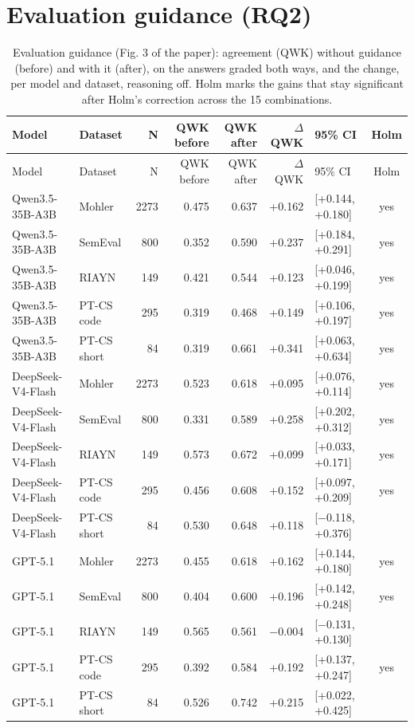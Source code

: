 \documentclass[10pt]{article}
\begin{document}
\section{Evaluation guidance (RQ2)}
\begingroup\footnotesize
\begin{longtable}{llrrrrlc}
\caption{Evaluation guidance (Fig. 3 of the paper): agreement (QWK) without guidance (before) and with it (after), on the answers graded both ways, and the change, per model and dataset, reasoning off. Holm marks the gains that stay significant after Holm's correction across the 15 combinations.}\\
\hline
Model & Dataset & N & QWK before & QWK after & $\Delta$QWK & 95\% CI & Holm \\ \hline
\endfirsthead
\hline
Model & Dataset & N & QWK before & QWK after & $\Delta$QWK & 95\% CI & Holm \\ \hline
\endhead
Qwen3.5-35B-A3B & Mohler & 2273 & 0.475 & 0.637 & +0.162 & [+0.144, +0.180] & yes \\
Qwen3.5-35B-A3B & SemEval & 800 & 0.352 & 0.590 & +0.237 & [+0.184, +0.291] & yes \\
Qwen3.5-35B-A3B & RIAYN & 149 & 0.421 & 0.544 & +0.123 & [+0.046, +0.199] & yes \\
Qwen3.5-35B-A3B & PT-CS code & 295 & 0.319 & 0.468 & +0.149 & [+0.106, +0.197] & yes \\
Qwen3.5-35B-A3B & PT-CS short & 84 & 0.319 & 0.661 & +0.341 & [+0.063, +0.634] & yes \\
DeepSeek-V4-Flash & Mohler & 2273 & 0.523 & 0.618 & +0.095 & [+0.076, +0.114] & yes \\
DeepSeek-V4-Flash & SemEval & 800 & 0.331 & 0.589 & +0.258 & [+0.202, +0.312] & yes \\
DeepSeek-V4-Flash & RIAYN & 149 & 0.573 & 0.672 & +0.099 & [+0.033, +0.171] & yes \\
DeepSeek-V4-Flash & PT-CS code & 295 & 0.456 & 0.608 & +0.152 & [+0.097, +0.209] & yes \\
DeepSeek-V4-Flash & PT-CS short & 84 & 0.530 & 0.648 & +0.118 & [$-$0.118, +0.376] &  \\
GPT-5.1 & Mohler & 2273 & 0.455 & 0.618 & +0.162 & [+0.144, +0.180] & yes \\
GPT-5.1 & SemEval & 800 & 0.404 & 0.600 & +0.196 & [+0.142, +0.248] & yes \\
GPT-5.1 & RIAYN & 149 & 0.565 & 0.561 & $-$0.004 & [$-$0.131, +0.130] &  \\
GPT-5.1 & PT-CS code & 295 & 0.392 & 0.584 & +0.192 & [+0.137, +0.247] & yes \\
GPT-5.1 & PT-CS short & 84 & 0.526 & 0.742 & +0.215 & [+0.022, +0.425] &  \\
\hline
\end{longtable}
\endgroup
\end{document}
